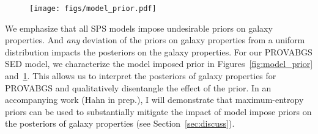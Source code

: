 \begin{figure}
\begin{center}
\texttt{[image: figs/model\_prior.pdf]}
    \caption{
    }\label{fig:sfh_prior}
\end{center}
\end{figure}


We emphasize that all SPS models impose undesirable priors on galaxy
properties. 
And \emph{any} deviation of the priors on galaxy properties from a uniform
distribution impacts the posteriors on the galaxy properties. 
For our PROVABGS SED model, we characterize the model imposed prior in 
Figures~\ref{fig:model_prior} and~\ref{fig:sfh_prior}.
This allows us to interpret the posteriors of galaxy properties for PROVABGS
and qualitatively disentangle the effect of the prior. 
In an accompanying work (Hahn in prep.), I will demonstrate that
maximum-entropy priors can be used to substantially mitigate the impact of
model impose priors on the posteriors of galaxy properties
(see Section~\ref{sec:discuss}). 
